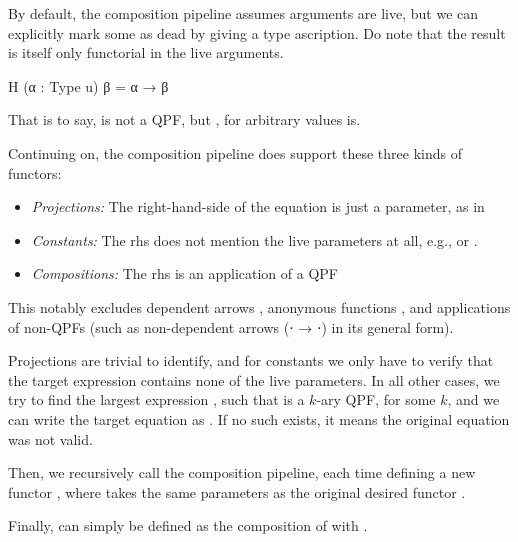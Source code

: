 By default, the composition pipeline assumes arguments are live, but we can explicitly mark some as dead
by giving a type ascription. Do note that the result is itself only functorial in the live arguments.
\begin{leancode}
    H (α : Type u) β = α → β 
\end{leancode}
That is to say,  is not a QPF, but , for arbitrary values  is.




Continuing on, the composition pipeline does support these three kinds of functors:
\begin{itemize}
    \item \emph{Projections: } The right-hand-side of the equation is just a parameter, as in 
    \item \emph{Constants: } The rhs does not mention the live parameters at all, e.g.,  or 
                .
    \item \emph{Compositions: } The rhs is an application of a QPF
\end{itemize}

This notably excludes dependent arrows , anonymous functions ,
and applications of non-QPFs (such as non-dependent arrows (⋅ → ⋅) in its general form).



Projections are trivial to identify, and for constants we only have to verify that the target expression contains none of the live parameters. 
In all other cases, we try to find the largest expression , such that  is a $k$-ary QPF, for some $k$, and we can write the target equation as
.
If no such  exists, it means the original equation was not valid.


Then, we recursively call the composition pipeline, each time defining a new functor , where  takes the same parameters as the original desired functor .

Finally,  can simply be defined as the composition of  with \lean{![H₁, ..., Hₘ]}.





































